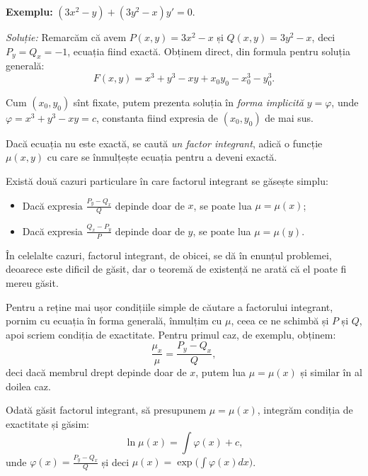 \vspace{1cm}

\textbf{Exemplu:} $(3x^2 - y) + (3y^2 - x) y' = 0$.

\emph{Soluție:} Remarcăm că avem $P(x, y) = 3x^2 - x$ și $Q(x, y) = 3y^2 - x$, deci
$P_y = Q_x = -1$, ecuația fiind exactă. Obținem direct, din formula pentru soluția generală:
\[
  F(x, y) = x^3 + y^3 - xy + x_0y_0 - x_0^3 - y_0^3.
\]

Cum $(x_0, y_0)$ sînt fixate, putem prezenta soluția în \emph{forma implicită} $y = \varphi$,
unde $\varphi = x^3 + y^3 - xy = c$, constanta fiind expresia de $(x_0, y_0)$ de mai sus.

\vspace{1cm}

Dacă ecuația nu este exactă, se caută \emph{un factor integrant}, adică o funcție $\mu(x, y)$
cu care se înmulțește ecuația pentru a deveni exactă.

Există două cazuri particulare în care factorul integrant se găsește simplu:
\begin{itemize}
\item Dacă expresia $\frac{P_y - Q_x}{Q}$ depinde doar de $x$, se poate lua $\mu = \mu(x)$;
\item Dacă expresia $\frac{Q_x - P_y}{P}$ depinde doar de $y$, se poate lua $\mu = \mu(y)$.
\end{itemize}

În celelalte cazuri, factorul integrant, de obicei, se dă în enunțul problemei, deoarece este
dificil de găsit, dar o teoremă de existență ne arată că el poate fi mereu găsit.

\begin{remark}\label{rk:int}
  Pentru a reține mai ușor condițiile simple de căutare a factorului integrant, pornim cu
  ecuația în forma generală, înmulțim cu $\mu$, ceea ce ne schimbă și $P$ și $Q$, apoi scriem
  condiția de exactitate. Pentru primul caz, de exemplu, obținem:
  \[
    \frac{\mu_x}{\mu} = \frac{P_y - Q_x}{Q},
  \]
  deci dacă membrul drept depinde doar de $x$, putem lua $\mu = \mu(x)$ și similar în al doilea caz.
\end{remark}

Odată găsit factorul integrant, să presupunem $\mu = \mu(x)$, integrăm condiția de exactitate și găsim:
\[
  \ln \mu(x) = \int \varphi(x) + c,
\]
unde $\varphi(x) = \frac{P_y - Q_x}{Q}$ și deci $\mu(x) = \exp \Big( \int \varphi(x) dx \Big)$.

\vspace{1cm}

